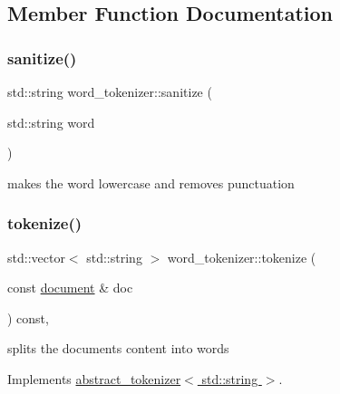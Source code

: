 \subsection{Member Function Documentation}
\mbox{\label{classword__tokenizer_ad214c1e5a60c0c0ea428f4a1df1ee4e0}} 
\subsubsection{\texorpdfstring{sanitize()}{sanitize()}}
{\footnotesize\ttfamily std\+::string word\+\_\+tokenizer\+::sanitize (\begin{DoxyParamCaption}\item[{std\+::string}]{word }\end{DoxyParamCaption})\hspace{0.3cm}{\ttfamily [static]}}

makes the word lowercase and removes punctuation \mbox{\label{classword__tokenizer_ab0308f2cf9249f3c296307a055ee78df}} 
\subsubsection{\texorpdfstring{tokenize()}{tokenize()}}
{\footnotesize\ttfamily std\+::vector$<$ std\+::string $>$ word\+\_\+tokenizer\+::tokenize (\begin{DoxyParamCaption}\item[{const \hyperlink{classdocument}{document} \&}]{doc }\end{DoxyParamCaption}) const\hspace{0.3cm}{\ttfamily [override]}, {\ttfamily [virtual]}}

splits the document\textquotesingle{}s content into words 

Implements \hyperlink{classabstract__tokenizer_a5948210e787d9ed3681800b4e3926701}{abstract\+\_\+tokenizer$<$ std\+::string $>$}.

\mbox{\label{classword__tokenizer_afa183b351b9322ed7a609796b56563cf}} 
